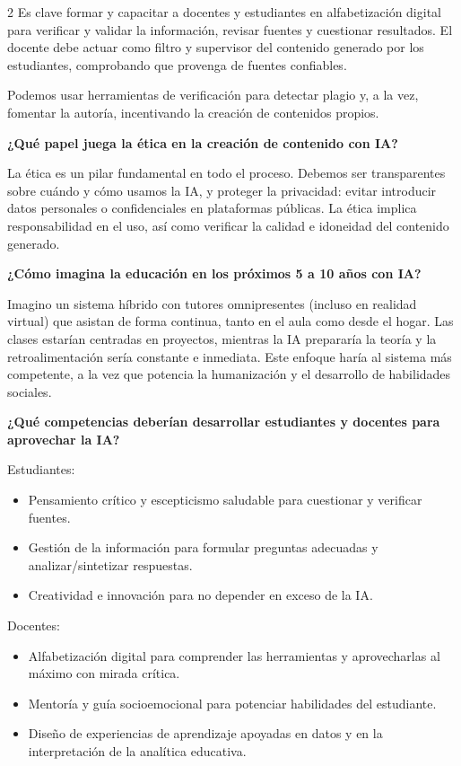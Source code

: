 \documentclass[12pt,spanish,Letterpaper,openany]{book}
\providecommand{\tightlist}{%
  \setlength{\itemsep}{0pt}\setlength{\parskip}{0pt}}
\begin{document}
\begin {multicols}{2}
Es clave formar y capacitar a docentes y estudiantes en alfabetización digital para verificar y validar la información, revisar fuentes y cuestionar resultados. El docente debe actuar como filtro y supervisor del contenido generado por los estudiantes, comprobando que provenga de fuentes confiables.

Podemos usar herramientas de verificación para detectar plagio y, a la vez, fomentar la autoría, incentivando la creación de contenidos propios.

\textbf{¿Qué papel juega la ética en la creación de contenido con IA?}

La ética es un pilar fundamental en todo el proceso. Debemos ser transparentes sobre cuándo y cómo usamos la IA, y proteger la privacidad: evitar introducir datos personales o confidenciales en plataformas públicas. La ética implica responsabilidad en el uso, así como verificar la calidad e idoneidad del contenido generado.

\textbf{¿Cómo imagina la educación en los próximos 5 a 10 años con IA?}

Imagino un sistema híbrido con tutores omnipresentes (incluso en realidad virtual) que asistan de forma continua, tanto en el aula como desde el hogar. Las clases estarían centradas en proyectos, mientras la IA prepararía la teoría y la retroalimentación sería constante e inmediata. Este enfoque haría al sistema más competente, a la vez que potencia la humanización y el desarrollo de habilidades sociales.

\textbf{¿Qué competencias deberían desarrollar estudiantes y docentes para aprovechar la IA?}

Estudiantes:

\begin{itemize}
\tightlist
\item
  Pensamiento crítico y escepticismo saludable para cuestionar y verificar fuentes.
\item
  Gestión de la información para formular preguntas adecuadas y analizar/sintetizar respuestas.
\item
  Creatividad e innovación para no depender en exceso de la IA.
\end{itemize}

Docentes:

\begin{itemize}
\tightlist
\item
  Alfabetización digital para comprender las herramientas y aprovecharlas al máximo con mirada crítica.
\item
  Mentoría y guía socioemocional para potenciar habilidades del estudiante.
\item
  Diseño de experiencias de aprendizaje apoyadas en datos y en la interpretación de la analítica educativa.
\end{itemize}


\end{multicols}
\end{document}
